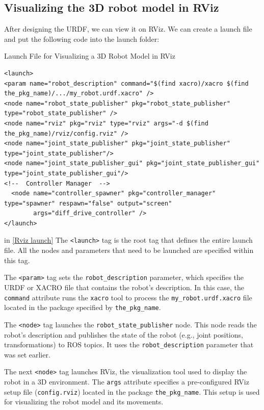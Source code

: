 \documentclass[../../main]{subfiles}
\begin{document}
\subsection{Visualizing the 3D robot model in RViz}
After designing the URDF, we can view it on RViz.
We can create a launch file and put the following code into the launch folder:
\begin{codebox}[label=Rviz launch]{Launch File for Visualizing a 3D Robot Model in RViz}
  \begin{verbatim}
<launch>
<param name="robot_description" command="$(find xacro)/xacro $(find the_pkg_name)/.../my_robot.urdf.xacro" />
<node name="robot_state_publisher" pkg="robot_state_publisher" type="robot_state_publisher" />
<node name="rviz" pkg="rviz" type="rviz" args="-d $(find the_pkg_name)/rviz/config.rviz" />
<node name="joint_state_publisher" pkg="joint_state_publisher" 
type="joint_state_publisher"/>
<node name="joint_state_publisher_gui" pkg="joint_state_publisher_gui" type="joint_state_publisher_gui"/>
<!--  Controller Manager  -->
  <node name="controller_spawner" pkg="controller_manager" type="spawner" respawn="false" output="screen"
        args="diff_drive_controller" /> 
</launch>
    \end{verbatim}
  \end{codebox}
in \cref{Rviz launch} The \texttt{<launch>} tag is the root tag that defines the entire launch file. All the nodes and parameters that need to be launched are specified within this tag.

    The \texttt{<param>} tag sets the \texttt{robot\_description} parameter, which specifies the URDF or XACRO file that contains the robot’s description. In this case, the \texttt{command} attribute runs the \texttt{xacro} tool to process the \texttt{my\_robot.urdf.xacro} file located in the package specified by \texttt{the\_pkg\_name}.
    
    The \texttt{<node>} tag launches the \texttt{robot\_state\_publisher} node. This node reads the robot’s description and publishes the state of the robot (e.g., joint positions, transformations) to ROS topics. It uses the \texttt{robot\_description} parameter that was set earlier.
    
    The next \texttt{<node>} tag launches RViz, the visualization tool used to display the robot in a 3D environment. The \texttt{args} attribute specifies a pre-configured RViz setup file (\texttt{config.rviz}) located in the package \texttt{the\_pkg\_name}. This setup is used for visualizing the robot model and its movements.
    
\end{document}
